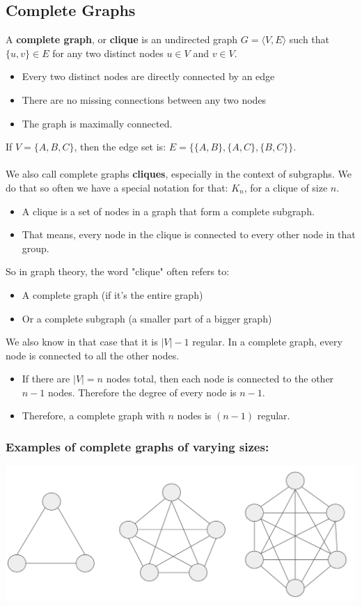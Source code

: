 \documentclass[10pt]{article}
\begin{document}
\subsection*{Complete Graphs}
A \textbf{complete graph}, or \textbf{clique} is an undirected graph $G = \langle V, E \rangle$ such that $\{u, v\} \in E$ for any two distinct nodes $u \in V$ and $v \in V$.
\begin{itemize}
	\item Every two distinct nodes are directly connected by an edge
	\item There are no missing connections between any two nodes
	\item The graph is maximally connected.
\end{itemize}
If $V = \{A, B, C\}$, then the edge set is: $E = \{\{A, B\}, \{A, C\}, \{B, C\}\}$.\\\\
We also call complete graphs \textbf{cliques}, especially in the context of subgraphs.  We do that so often we have a special notation for that: $K_n$, for a clique of size $n$.
\begin{itemize}
	\item A clique is a set of nodes in a graph that form a complete subgraph.
	\item That means, every node in the clique is connected to every other node in that group.
\end{itemize}
So in graph theory, the word "clique" often refers to:
\begin{itemize}
	\item A complete graph (if it's the entire graph)
	\item Or a complete subgraph (a smaller part of a bigger graph)
\end{itemize}
We also know in that case that it is $|V| - 1$ regular.  In a complete graph, every node is connected to all the other nodes.
\begin{itemize}
	\item If there are $|V| = n$ nodes total, then each node is connected to the other $n - 1$ nodes.  Therefore the degree of every node is $n - 1$.
	\item Therefore, a complete graph with $n$ nodes is $(n - 1)$ regular.
\end{itemize}
\subsubsection*{Examples of complete graphs of varying sizes:}
\begin{center} 
	\includegraphics*[width=\textwidth]{M4_4.png} 
\end{center}
\end{document}
